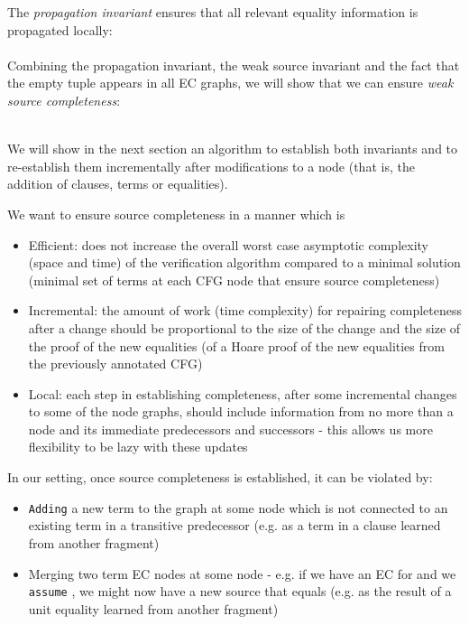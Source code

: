 The \emph{propagation invariant}  ensures that all relevant equality information is propagated locally:\\
 \\
Combining the propagation invariant, the weak source invariant and the fact that the empty tuple appears in all EC graphs, we will show that we can ensure \emph{weak source completeness}:\\
\\

We will show in the next section an algorithm to establish both invariants and to re-establish them incrementally after modifications to a node (that is, the addition of clauses, terms or equalities).

\noindent
We want to ensure source completeness in a manner which is
\begin{itemize}
	\item Efficient: does not increase the overall worst case asymptotic complexity (space and time) of the verification algorithm compared to a minimal solution (minimal set of terms at each CFG node that ensure source completeness)
	\item Incremental: the amount of work (time complexity) for repairing completeness after a change should be proportional to the size of the change and the size of the proof of the new equalities (of a Hoare proof of the new equalities from the previously annotated CFG)
	\item Local: each step in establishing completeness, after some incremental changes to some of the node graphs, should include information from no more than a node and its immediate predecessors and successors - this allows us more flexibility to be lazy with these updates
\end{itemize}

In our setting, once source completeness is established, it can be violated by:
\begin{itemize}
	\item \lstinline{Adding} a new term to the graph at some node  which is not connected to an existing term in a transitive predecessor  (e.g. as a term in a clause learned from another fragment)
	\item Merging two term EC nodes at some node  - e.g. if we have an EC for  and we \lstinline{assume} , we might now have a new source that equals  (e.g. as the result of a unit equality learned from another fragment)
\end{itemize}

